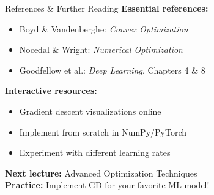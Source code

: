 \documentclass[aspectratio=169,11pt]{beamer}
\begin{document}
\begin{frame}{References \& Further Reading}
\textbf{Essential references:}
\begin{itemize}
\item Boyd \& Vandenberghe: \emph{Convex Optimization}
\item Nocedal \& Wright: \emph{Numerical Optimization}
\item Goodfellow et al.: \emph{Deep Learning}, Chapters 4 \& 8
\end{itemize}

\pause
\textbf{Interactive resources:}
\begin{itemize}
\item Gradient descent visualizations online
\item Implement from scratch in NumPy/PyTorch
\item Experiment with different learning rates
\end{itemize}

\pause
\vspace{0.5cm}
\begin{center}
\textbf{Next lecture:} Advanced Optimization Techniques\\
\textbf{Practice:} Implement GD for your favorite ML model!
\end{center}
\end{frame}
\end{document}
